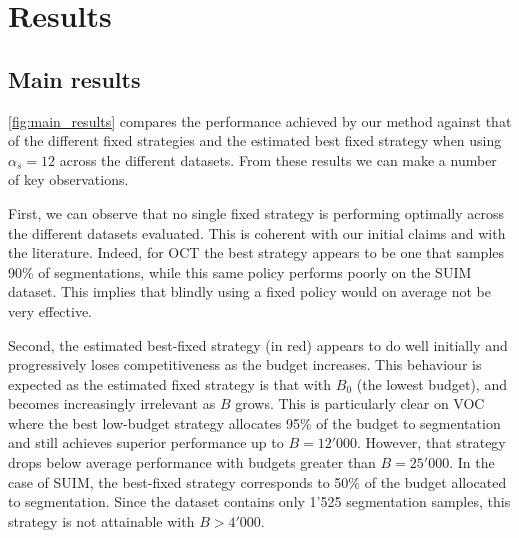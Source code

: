 \section{Results}
\label{sec:results}

\subsection{Main results}
\cref{fig:main_results} compares the performance achieved by our method against that of the different fixed strategies and the estimated best fixed strategy when using $\alpha_s = 12$ across the different datasets. From these results we can make a number of key observations. 

First, we can observe that no single fixed strategy is performing optimally across the different datasets evaluated. This is coherent with our initial claims and with the literature. Indeed, for OCT the best strategy appears to be one that samples 90\% of segmentations, while this same policy performs poorly on the SUIM dataset. This implies that blindly using a fixed policy would on average not be very effective.

Second, the estimated best-fixed strategy (in red) appears to do well initially and progressively loses competitiveness as the budget increases. This behaviour is expected as the estimated fixed strategy is that with $B_0$ (the lowest budget), and becomes increasingly irrelevant as $B$ grows. This is particularly clear on VOC where the best low-budget strategy allocates 95\% of the budget to segmentation and still achieves superior performance up to $B=12'000$. However, that strategy drops below average performance with budgets greater than $B=25'000$. In the case of SUIM, the best-fixed strategy corresponds to 50\% of the budget allocated to segmentation. Since the dataset contains only 1'525 segmentation samples, this strategy is not attainable with $B > 4'000$.

